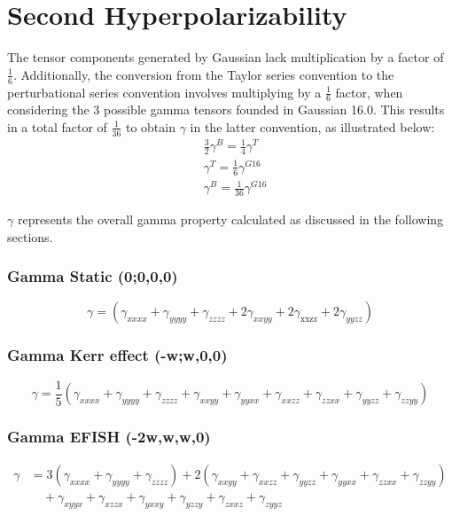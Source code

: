 \documentclass{article}
\begin{document}
	\section{Second Hyperpolarizability}
	The tensor components generated by Gaussian lack multiplication by a factor of $\frac{1}{6}$. Additionally, the conversion from the Taylor series convention to the perturbational series convention involves multiplying by a $\frac{1}{6}$ factor, when considering the 3 possible gamma tensors founded in Gaussian 16.0. This results in a total factor of $\frac{1}{36}$ to obtain $\gamma$ in the latter convention, as illustrated below:
	\begin{align}
	&\frac{3}{2} \gamma^{B} = \frac{1}{4} \gamma^{T} \nonumber \\
	&\gamma^{T} = \frac{1}{6} \gamma^{G16} \nonumber \\
	&\gamma^{B} = \frac{1}{36}\gamma^{G16} 
	\end{align}
	
	$\gamma$ represents the overall gamma property calculated as discussed in the following sections.
		\subsubsection{Gamma Static (0;0,0,0)}
	\begin{equation}\label{eq:gamma_static}
	\gamma = \left({\gamma_{xxxx}} + {\gamma_{yyyy}} + {\gamma_{zzzz}} + 2{\gamma_{xxyy}} + 2\gamma_{\text{xxzz}} + 2{\gamma_{yyzz}}\right)
	\end{equation}
	\subsubsection{Gamma Kerr effect (-w;w,0,0)}
	\begin{equation}\label{eq:gamma_kerr}
	\gamma = \frac{1}{5}\left(\gamma_{{xxxx}} + \gamma_{{yyyy}} + \gamma_{{zzzz}} + \gamma_{{xxyy}} + \gamma_{{yyxx}}+ \gamma_{{xxzz}} + \gamma_{{zzxx}} + \gamma_{{yyzz}} + \gamma_{{zzyy}}\right)
	\end{equation}
	
	\subsubsection{Gamma EFISH (-2w,w,w,0)}
	\begin{align}\label{eq:gamma_efish}
	\gamma &= 3\left({\gamma_{xxxx}}+ {\gamma_{yyyy}} + {\gamma_{zzzz}}\right) + 2\left({\gamma_{xxyy}} + {\gamma_{xxzz}} + {\gamma_{yyzz}} + {\gamma_{yyxx}} + \gamma_{zzxx} + {\gamma_{zzyy}}\right) \nonumber \\
	&\quad + {\gamma_{xyyx}} + {\gamma_{xzzx}}+ {\gamma_{yxxy}} + {\gamma_{yzzy}} + {\gamma_{zxxz}} + {\gamma_{zyyz}} 
	\end{align}
	
\end{document}
